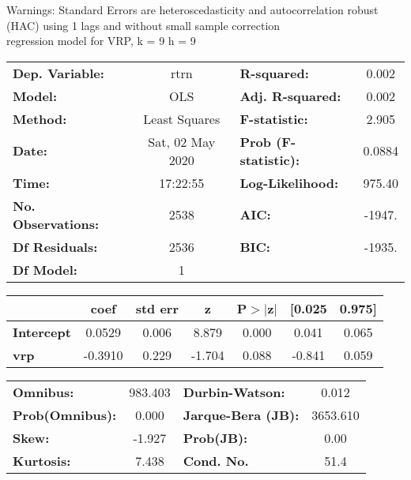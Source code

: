 Warnings: \newline
 [1] Standard Errors are heteroscedasticity and autocorrelation robust (HAC) using 1 lags and without small sample correction\\ 

regression model for VRP, k = 9 h = 9\begin{center}
\begin{tabular}{lclc}
\toprule
\textbf{Dep. Variable:}    &       rtrn       & \textbf{  R-squared:         } &     0.002   \\
\textbf{Model:}            &       OLS        & \textbf{  Adj. R-squared:    } &     0.002   \\
\textbf{Method:}           &  Least Squares   & \textbf{  F-statistic:       } &     2.905   \\
\textbf{Date:}             & Sat, 02 May 2020 & \textbf{  Prob (F-statistic):} &   0.0884    \\
\textbf{Time:}             &     17:22:55     & \textbf{  Log-Likelihood:    } &    975.40   \\
\textbf{No. Observations:} &        2538      & \textbf{  AIC:               } &    -1947.   \\
\textbf{Df Residuals:}     &        2536      & \textbf{  BIC:               } &    -1935.   \\
\textbf{Df Model:}         &           1      & \textbf{                     } &             \\
\bottomrule
\end{tabular}
\begin{tabular}{lcccccc}
                   & \textbf{coef} & \textbf{std err} & \textbf{z} & \textbf{P$> |$z$|$} & \textbf{[0.025} & \textbf{0.975]}  \\
\midrule
\textbf{Intercept} &       0.0529  &        0.006     &     8.879  &         0.000        &        0.041    &        0.065     \\
\textbf{vrp}       &      -0.3910  &        0.229     &    -1.704  &         0.088        &       -0.841    &        0.059     \\
\bottomrule
\end{tabular}
\begin{tabular}{lclc}
\textbf{Omnibus:}       & 983.403 & \textbf{  Durbin-Watson:     } &    0.012  \\
\textbf{Prob(Omnibus):} &   0.000 & \textbf{  Jarque-Bera (JB):  } & 3653.610  \\
\textbf{Skew:}          &  -1.927 & \textbf{  Prob(JB):          } &     0.00  \\
\textbf{Kurtosis:}      &   7.438 & \textbf{  Cond. No.          } &     51.4  \\
\bottomrule
\end{tabular}
\end{center}


